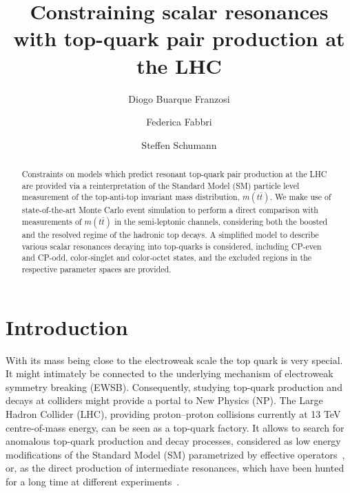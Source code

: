 \documentclass[aps,prd,amsmath,amssymb,superscriptaddress, preprintnumbers,preprint,nofootinbib,a4paper]{revtex4}
\newcommand{\ttb}{t\bar{t}}
\begin{document}
\title{Constraining scalar resonances with top-quark pair production at the LHC}

\author{Diogo Buarque Franzosi}

\author{Federica Fabbri}

\author{Steffen Schumann}
 

\begin{abstract}

  Constraints on models which predict resonant top-quark pair production at the LHC are provided via
  a reinterpretation of the Standard Model (SM) particle level measurement of the top-anti-top invariant
  mass distribution, $m(\ttb)$. We make use of state-of-the-art Monte Carlo event simulation to perform
  a direct comparison with measurements of $m(\ttb)$ in the semi-leptonic channels, considering both the
  boosted and the resolved regime of the hadronic top decays. A simplified model to describe various
  scalar resonances decaying into top-quarks is considered, including CP-even and CP-odd, color-singlet
  and color-octet states, and the excluded regions in the respective parameter spaces are provided.

\end{abstract}
 
\maketitle


\tableofcontents

\section{Introduction}

With its mass being close to the electroweak scale the top quark is very special. It might intimately
be connected to the underlying mechanism of electroweak symmetry breaking (EWSB). Consequently, studying
top-quark production and decays at colliders might provide a portal to New Physics (NP). The
Large Hadron Collider (LHC), providing proton--proton collisions currently at 13 TeV centre-of-mass energy,
can be seen as a top-quark factory. It allows to search for anomalous top-quark production and decay processes,
considered as low energy modifications of the Standard Model (SM) parametrized by effective operators~\cite{Barger:2011pu,Choi:2012fc,Franzosi:2015osa,Zhang:2016omx,Englert:2016aei,Cirigliano:2016nyn}, or,
as the direct production of intermediate resonances, which have been hunted for a long time at different
experiments~\cite{Aaltonen:2009tx,Khachatryan:2015sma,Chatrchyan:2013lca}. 
\end{document}
